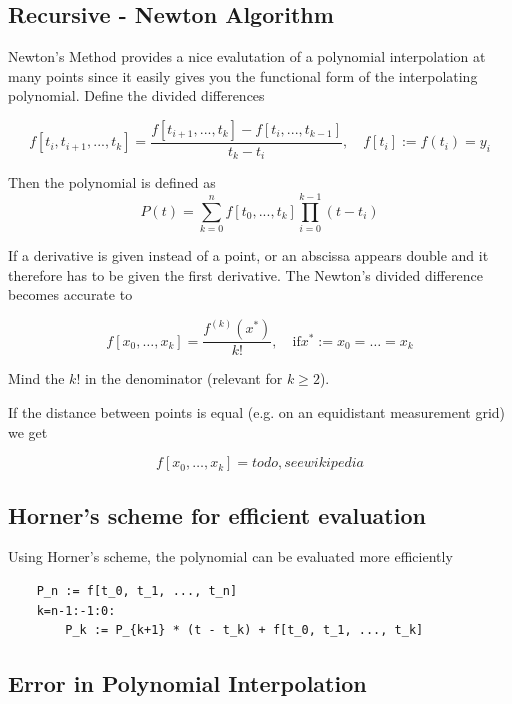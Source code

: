 \documentclass[
    a4paper,
    11pt
]{article}
\begin{document}
\subsection{Recursive - Newton Algorithm}

Newton's Method provides a nice evalutation of a polynomial interpolation at
many points since it easily gives you the functional form of the interpolating
polynomial. Define the divided differences

\begin{equation}
    f[t_i, t_{i+1}, ..., t_k] =
    \frac{f[t_{i+1}, ..., t_k] - f[t_i, ..., t_{k-1}]}{t_k - t_i},
    \quad
    f[t_i] := f(t_i) = y_i
\end{equation}

Then the polynomial is defined as
\begin{equation}
    P(t) = \sum_{k=0}^{n} f[t_0, ..., t_k] \prod_{i=0}^{k-1}(t - t_i)
\end{equation}

If a derivative is given instead of a point, or an abscissa appears double and
it therefore has to be given the first derivative. The Newton's divided
difference becomes accurate to

\begin{equation}
    f[x_0, \dots, x_k] = \frac{f^{(k)}(x^*)}{k!}, \quad \text{if} x^* := x_0 =
    \dots = x_k
\end{equation}

Mind the $k!$ in the denominator (relevant for $k \geq 2$).

If the distance between points is equal (e.g. on an equidistant measurement
grid) we get

\begin{equation}
    f[x_0, \dots, x_k] = todo, see wikipedia
\end{equation}

\subsection{Horner's scheme for efficient evaluation}

Using Horner's scheme, the polynomial can be evaluated more efficiently
\begin{verbatim}
    P_n := f[t_0, t_1, ..., t_n]
    k=n-1:-1:0:
        P_k := P_{k+1} * (t - t_k) + f[t_0, t_1, ..., t_k]
\end{verbatim}

\subsection{Error in Polynomial Interpolation}
\end{document}
